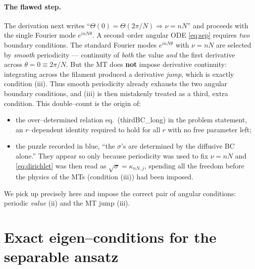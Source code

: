 \documentclass{article}
\begin{document}
\paragraph{The flawed step.} The derivation next writes
``$\Theta(0)=\Theta(2\pi/N)\Rightarrow \nu=nN$'' and proceeds with the single
Fourier mode $e^{inN\theta}$. A second--order angular ODE \eqref{eq:sep}
requires \emph{two} boundary conditions. The standard Fourier modes
$e^{inN\theta}$ with $\nu=nN$ are selected by \emph{smooth} periodicity ---
continuity of \emph{both} the value \emph{and} the first derivative across
$\theta=0\equiv2\pi/N$. But the MT does \textbf{not} impose derivative
continuity: integrating across the filament produced a derivative \emph{jump},
which is exactly condition (iii). Thus smooth periodicity already exhausts the
two angular boundary conditions, and (iii) is then mistakenly treated as a
third, extra condition. This double--count is the origin of:
\begin{itemize}
\item the over--determined relation eq.~(thirdBC\_long) in the problem
statement, an $r$--dependent identity required to hold for all $r$ with no free
parameter left;
\item the puzzle recorded in blue, ``the $\sigma$'s are determined by the
diffusive BC alone.'' They appear so only because periodicity was used to fix
$\nu=nN$ and \eqref{eq:dirichlet} was then read as $\sqrt\sigma=\kappa_{nN,j}$,
spending all the freedom before the physics of the MTs (condition (iii)) had
been imposed.
\end{itemize}
We pick up precisely here and impose the correct pair of angular conditions:
periodic \emph{value} (ii) and the MT jump (iii).

\section{Exact eigen--conditions for the separable ansatz}
\end{document}
